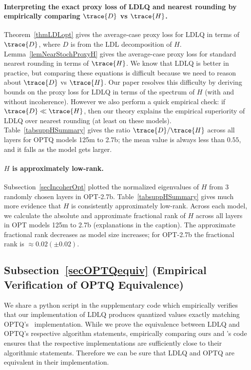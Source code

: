 \paragraph{Interpreting the exact proxy loss of LDLQ and nearest rounding by empirically comparing $\trace{D}$ vs $\trace{H}$.}
Theorem~\ref{thmLDLopt} gives the average-case proxy loss for LDLQ in terms of $\trace{D}$, where $D$ is from the LDL decomposition of $H$.
Lemma~\ref{lemNearStochProxyH} gives the average-case proxy loss for standard nearest rounding in terms of $\trace{H}$.
We know that LDLQ is better in practice, but comparing these equations is difficult because we need to reason about $\trace{D}$ vs $\trace{H}$.
Our paper resolves this difficulty by deriving bounds on the proxy loss for LDLQ in terms of the spectrum of $H$ (with and without incoherence).
However we also perform a quick empirical check: if $\trace{D} \ll \trace{H}$, then our theory explains the empirical superiority of LDLQ over nearest rounding (at least on these models).
Table~\ref{tabsuppHSummary} gives the ratio $\trace{D} / \trace{H}$ across all layers for OPTQ models 125m to 2.7b; the mean value is always less than $0.55$, and it falls as the model gets larger. 

\paragraph{$H$ is approximately low-rank.}
Subsection~\ref{secIncoherOpt} plotted the normalized eigenvalues of $H$ from 3 randomly chosen layers in OPT-2.7b.
Table~\ref{tabsuppHSummary} gives much more evidence that $H$ is consistently approximately low-rank.
Across each model, we calculate the absolute and approximate fractional rank of $H$ across all layers in OPT models 125m to 2.7b (explanations in the caption).
The approximate fractional rank decreases as model size increases; for OPT-2.7b the fractional rank is $\approx 0.02 (\pm 0.02)$.


\subsection{Subsection~\ref{secOPTQequiv} (Empirical Verification of OPTQ Equivalence)}
We share a python script in the supplementary code which empirically verifies that our implementation of LDLQ produces quantized values exactly matching OPTQ's~\cite{frantar2023gptq} implementation.
While we prove the equivalence between LDLQ and OPTQ's respective algorithm statements, empirically comparing ours and \citet{frantar2023gptq}'s code ensures that the respective implementations are sufficiently close to their algorithmic statements.
Therefore we can be sure that LDLQ and OPTQ are equivalent in their implementation.


